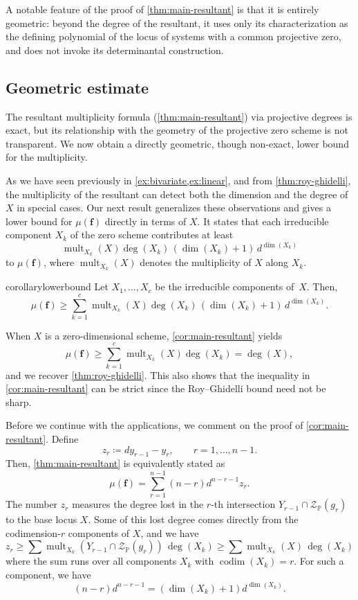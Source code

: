 \documentclass[11pt,letterpaper]{article}
\numberwithin{equation}{section}
\newcommand{\PP}{\mathbb{P}}
\newcommand{\cZ}{\mathcal{Z}}
\newcommand{\ff}{\ensuremath{\boldsymbol{f}}}
\DeclareMathOperator{\codim}{codim}
\DeclareMathOperator{\mult}{mult}
\begin{document}
A notable feature of the proof of \cref{thm:main-resultant} is that it is entirely geometric: beyond the degree of the resultant, it uses only its characterization as the defining polynomial of the locus of systems with a common projective zero, and does not invoke its determinantal construction.

\subsection{Geometric estimate}
The resultant multiplicity formula (\cref{thm:main-resultant}) via projective degrees is exact, but its relationship with the geometry of the projective zero scheme is not transparent.
We now obtain a directly geometric, though non-exact, lower bound for the multiplicity.

As we have seen previously in \cref{ex:bivariate,ex:linear}, and from \cref{thm:roy-ghidelli}, the multiplicity of the resultant can detect both the dimension and the degree of $X$ in special cases.
Our next result generalizes these observations and gives a lower bound for $\mu(\ff)$ directly in terms of $X$.
It states that each irreducible component $X_k$ of the zero scheme contributes at least \[
\mult_{X_k}(X)\deg(X_k)\, (\dim(X_k)+1) \, d^{\dim (X_k)}
\] to $\mu(\ff)$, where $\mult_{X_k}(X)$ denotes the multiplicity of $X$ along $X_k$.

\begin{restatable}{corollary}{lowerbound}
\label{cor:main-resultant}
    Let $X_1,\dots,X_c$ be the irreducible components of~$X$.
    Then, \[
    \mu(\ff)\geq \sum_{k=1}^c \mult_{X_k}(X)\deg(X_k)\, (\dim(X_k)+1)\, d^{\dim (X_k)}.
    \]
\end{restatable}

When $X$ is a zero-dimensional scheme, \cref{cor:main-resultant} yields \[
\mu(\ff)\geq \sum_{k=1}^c \mult_{X_k}(X)\deg(X_k) = \deg(X),
\] and we recover \cref{thm:roy-ghidelli}.
This also shows that the inequality in \cref{cor:main-resultant} can be strict since the Roy--Ghidelli bound need not be sharp.

Before we continue with the applications, we comment on the proof of \cref{cor:main-resultant}.
Define \[
z_r \coloneqq d y_{r-1}-y_r,\qquad r=1,\dots,n-1.
\] 
Then, \cref{thm:main-resultant} is equivalently stated as \[
\mu(\ff) = \sum_{r=1}^{n-1} (n-r) d^{n-r-1} z_r.
\] The number $z_r$ measures the degree lost in the $r$-th intersection $Y_{r-1}\cap \cZ_{\PP}(g_r)$ to the base locus $X$.
Some of this lost degree comes directly from the codimension-$r$ components of $X$, and we have \[
z_r \geq \sum\mult_{X_k}(Y_{r-1}\cap\cZ_{\PP}(g_r)) \, \deg(X_k) \geq  \sum\mult_{X_k}(X)\, \deg(X_k)
\] where the sum runs over all components $X_k$ with $\codim(X_k)=r$.
For such a component, we have \[
(n-r) d^{n-r-1} = (\dim(X_k)+1 )d^{\dim(X_k)}.
\]
\end{document}
